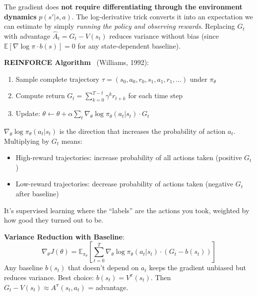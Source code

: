 \begin{intuitionbox}
The gradient does \textbf{not require differentiating through the environment dynamics} $p(s'|s,a)$. The log-derivative trick converts it into an expectation we can estimate by simply \emph{running the policy and observing rewards}. Replacing $G_t$ with advantage $\hat{A}_t = G_t - V(s_t)$ reduces variance without bias (since $\mathbb{E}[\nabla\log\pi \cdot b(s)] = 0$ for any state-dependent baseline).
\end{intuitionbox}

\textbf{REINFORCE Algorithm}~\cite{williams1992simple} (Williams, 1992):

\begin{enumerate}
  \item Sample complete trajectory $\tau = (s_0, a_0, r_0, s_1, a_1, r_1, \ldots)$ under $\pi_\theta$
  \item Compute return $G_t = \sum_{k=0}^{T-t} \gamma^k r_{t+k}$ for each time step
  \item Update: $\theta \leftarrow \theta + \alpha \sum_t \nabla_\theta \log \pi_\theta(a_t|s_t) \cdot G_t$
\end{enumerate}

\begin{intuitionbox}
$\nabla_\theta \log \pi_\theta(a_t|s_t)$ is the direction that increases the probability of action $a_t$. Multiplying by $G_t$ means:

\begin{itemize}
  \item High-reward trajectories: increase probability of all actions taken (positive $G_t$)
  \item Low-reward trajectories: decrease probability of actions taken (negative $G_t$ after baseline)
\end{itemize}

It’s supervised learning where the ``labels'' are the actions you took, weighted by how good they turned out to be.
\end{intuitionbox}

\textbf{Variance Reduction with Baseline}: 
\begin{equation}
\nabla_\theta J(\theta) = \mathbb{E}_{\pi_\theta}\left[\sum_{t=0}^T \nabla_\theta \log \pi_\theta(a_t|s_t) \cdot (G_t - b(s_t))\right]
\end{equation}
 Any baseline $b(s_t)$ that doesn’t depend on $a_t$ keeps the gradient unbiased but reduces variance. Best choice: $b(s_t) = V^\pi(s_t)$. Then $G_t - V(s_t) \approx A^\pi(s_t, a_t)$ = advantage.

